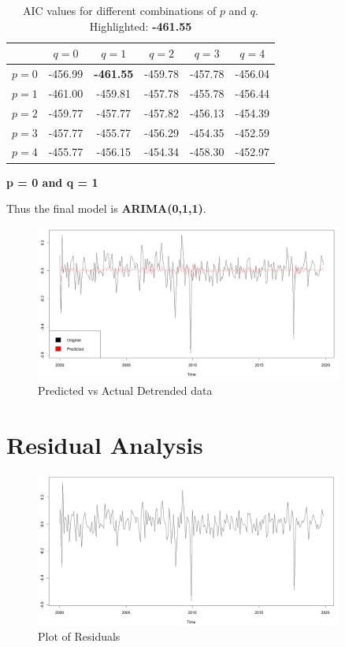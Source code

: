 \documentclass{article}
\begin{document}
\begin{table}[h]
\centering
\begin{tabular}{|c|c|c|c|c|c|}
\hline
 & $q=0$ & $q=1$ & $q=2$ & $q=3$ & $q=4$ \\
\hline
$p=0$ & -456.99& \textbf{-461.55}& -459.78& -457.78& -456.04\\
\hline
$p=1$ & -461.00& -459.81& -457.78& -455.78& -456.44\\
\hline
$p=2$ & -459.77& -457.77& -457.82& -456.13& -454.39\\
\hline
$p=3$ & -457.77& -455.77& -456.29& -454.35& -452.59\\
\hline
$p=4$ & -455.77& -456.15& -454.34& -458.30& -452.97\\
\hline
\end{tabular}
\caption{AIC values for different combinations of $p$ and $q$. \\Highlighted: \textbf{-461.55}}
\textbf{p = 0 and q = 1}
\end{table}

Thus the final model is \textbf{ARIMA(0,1,1)}.
\begin{figure}[h]
    \centering
    \includegraphics[width=0.9\textwidth]{Actual_vs_Predicted.png}
    \caption{Predicted vs Actual Detrended data}
    \label{fig:label6}
\end{figure}
\newpage

\section{Residual Analysis}{
\begin{figure}[h]
    \centering
    \includegraphics[width=0.9\textwidth]{Residuals.png}
    \caption{Plot of Residuals}
    \label{fig:label7}
\end{figure}
}
\end{document}
